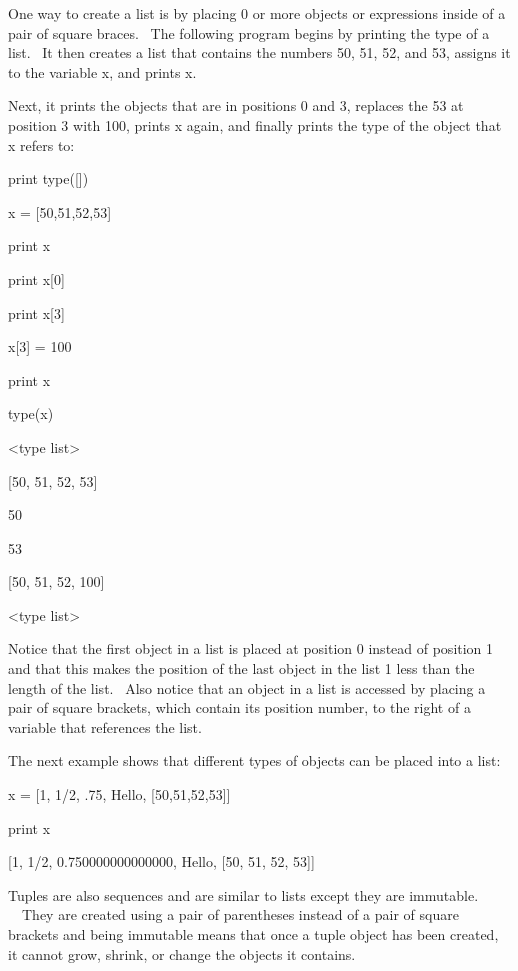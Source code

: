 \documentclass[12pt,twoside]{book}
\begin{document}
One way to create a list is by placing 0 or more objects or expressions inside of a pair of square braces. \ The following program begins by printing the type of a list. \ It then creates a list that contains the numbers 50, 51, 52, and 53, assigns it to the variable x, and prints x.

Next, it prints the objects that are in positions 0 and 3, replaces the 53 at position 3 with 100, prints x again, and finally prints the type of the object that x refers to: 

\bigskip

print type([])

x = [50,51,52,53]

print x

print x[0]

print x[3]

x[3] = 100

print x

type(x)

{\textbar}

{\textless}type {\textquotesingle}list{\textquotesingle}{\textgreater}

[50, 51, 52, 53]

50

53

[50, 51, 52, 100]

{\textless}type {\textquotesingle}list{\textquotesingle}{\textgreater}


\bigskip

Notice that the first object in a list is placed at position 0 instead of position 1 and that this makes the position of the last object in the list 1 less than the length of the list. \ Also notice that an object in a list is accessed by placing a pair of square brackets, which contain its position number, to the right of a variable that references the list.

The next example shows that different types of objects can be placed into a list: 

\bigskip

x = [1, 1/2, .75, {\textquotesingle}Hello{\textquotesingle}, [50,51,52,53]]

print x

{\textbar}

[1, 1/2, 0.750000000000000, {\textquotesingle}Hello{\textquotesingle}, [50, 51, 52, 53]]

Tuples are also sequences and are similar to lists except they are immutable. \ \ They are created using a pair of parentheses instead of a pair of square brackets and being immutable means that once a tuple object has been created, it cannot grow, shrink, or change the objects it contains. \ 
\end{document}
